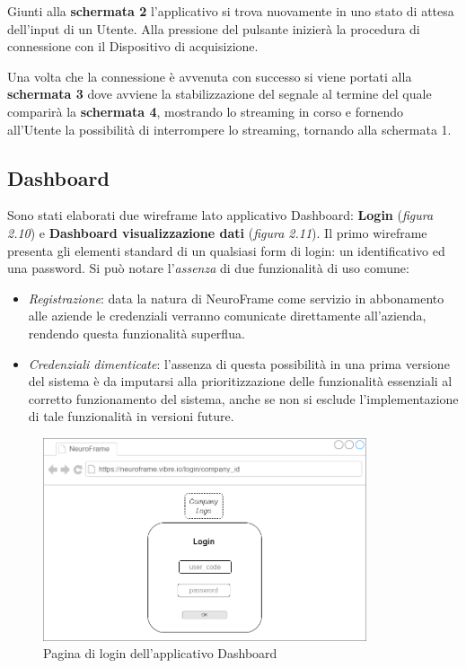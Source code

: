 \noindent Giunti alla {\bf schermata 2} l'applicativo si trova nuovamente in uno stato di attesa dell'input di un Utente.\newline
Alla pressione del pulsante inizierà la procedura di connessione con il Dispositivo di acquisizione.\newline

\noindent Una volta che la connessione è avvenuta con successo si viene portati alla {\bf schermata 3} dove avviene la stabilizzazione del segnale al termine del quale comparirà la {\bf schermata 4}, mostrando lo streaming in corso e fornendo all'Utente la possibilità di interrompere lo streaming, tornando alla schermata 1.\newline


\subsection{Dashboard}
Sono stati elaborati due wireframe lato applicativo Dashboard: {\bf Login} (\emph{figura 2.10}) e {\bf Dashboard visualizzazione dati} (\emph{figura 2.11}).\newline
Il primo wireframe presenta gli elementi standard di un qualsiasi form di login: un identificativo ed una password.\newline
Si può notare l'\emph{assenza} di due funzionalità di uso comune:
\begin{itemize}
  \item \emph{Registrazione}:
  data la natura di NeuroFrame come servizio in abbonamento alle aziende le credenziali verranno comunicate direttamente all'azienda, rendendo questa funzionalità superflua.
  \item \emph{Credenziali dimenticate}: 
  l'assenza di questa possibilità in una prima versione del sistema è da imputarsi alla prioritizzazione delle funzionalità essenziali al corretto funzionamento del sistema, anche se non si esclude l'implementazione di tale funzionalità in versioni future.
\end{itemize}
\begin{figure}[H]
  \centering
  \includegraphics[width=0.85\textwidth]{img/wireframe_login.png}
  \caption{Pagina di login dell'applicativo Dashboard}
\end{figure}
